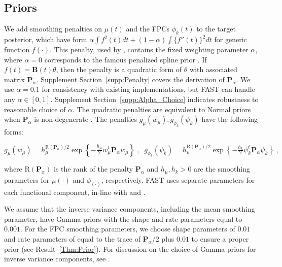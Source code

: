 \documentclass[12pt]{article}
\begin{document}
\subsection{Priors}\label{subsec:priors}

We add smoothing penalties on $\mu(t)$ and the FPCs $\phi_k(t)$ to the target posterior, which have form $\alpha \int f^2(t) dt + (1-\alpha) \int \{f''(t)\}^2 dt$ for generic function $f(\cdot)$. This penalty, used by \cite{goldsmith_generalized_2015}, contains the fixed weighting parameter $\alpha$, where $\alpha=0$ corresponds to the famous penalized spline prior \citep{cravenwahba1979,osullivan1986}. If $f(t) = \mathbf{B}(t)\theta$, then the penalty is a quadratic form of $\theta$ with associated matrix $\mathbf{P}_\alpha$. Supplement Section~\ref{supp:Penalty} covers the derivation of $\mathbf{P}_{\alpha}$. We use $\alpha = 0.1$ for consistency with existing implementations, but FAST can handle any $\alpha \in [0,1]$. Supplement Section~\ref{supp:Alpha_Choice} indicates robustness to reasonable choice of $\alpha$. The quadratic penalties are equivalent to Normal priors when $\mathbf{P}_\alpha$ is non-degenerate \citep{brumback1999,ruppert2003semiparametric,wood2006}. The penalties $g_\mu(w_\mu), g_{\phi_k}(\psi_k)$ have the following forms:

\begin{center}
$ g_\mu(w_{\mu}) = h_\mu^{\text{R}(\mathbf{P}_\alpha)/2}\exp\left\{-\frac{h_{\mu}}{2} w^t_{\mu}\mathbf{P}_{\alpha} w_{\mu}\right\}\;,\;\;
    g_{\phi_k}(\psi_k) = h_k^{\text{R}(\mathbf{P}_\alpha)/2}\exp\left\{-\frac{h_k}{2} \psi^t_k\mathbf{P}_{\alpha}\psi_k\right\}\;, 
$
\end{center}

\noindent where $\text{R}(\mathbf{P}_\alpha)$ is the rank of the penalty $\mathbf{P}_\alpha$ and $h_\mu,h_k>0$ are the smoothing parameters for $\mu(\cdot)$ and $\phi_(\cdot)$, respectively. FAST uses separate parameters for each functional component, in-line with \cite{ye_functional_2024} and \cite{goldsmith_generalized_2015}.

We assume that the inverse variance components, including the mean smoothing parameter, have Gamma priors with the shape and rate parameters equal to $0.001$. For the FPC smoothing parameters, we choose shape parameters of $0.01$ and rate parameters of equal to the trace of $\mathbf{P}_\alpha/2$ plus $0.01$ to ensure a proper prior (see Result~\ref{Thm:Prior}). For discussion on the choice of Gamma priors for inverse variance components, see \cite{crainiceanuwinbugs,crainiceanu_bayesian_2010}.
\end{document}
